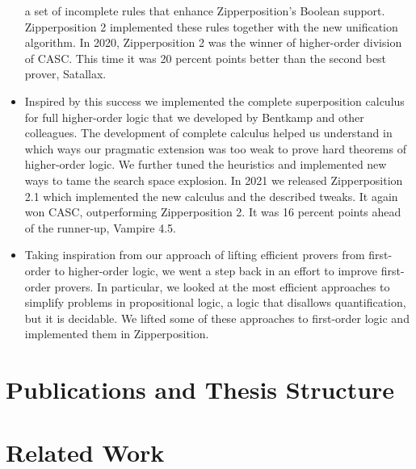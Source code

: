 \begin{itemize}
  a set of incomplete rules that enhance Zipperposition's Boolean support.
  Zipperposition 2 implemented these rules together with the new unification
  algorithm. In 2020, Zipperposition 2 was the winner of higher-order division
  of CASC. This time it was 20 percent points better than the second best
  prover, Satallax.
  \item Inspired by this success we implemented the complete superposition
  calculus for full higher-order logic that we developed by Bentkamp and other
  colleagues. The development of complete calculus helped us understand in which
  ways our pragmatic extension was too weak to prove hard theorems of
  higher-order logic. We further tuned the heuristics and implemented new ways
  to tame the search space explosion. In 2021 we released Zipperposition 2.1
  which implemented the new calculus and the described tweaks. It again won
  CASC, outperforming Zipperposition 2. It was 16 percent points ahead of the
  runner-up, Vampire 4.5. 

  \item Taking inspiration from our approach of lifting efficient provers from
  first-order to higher-order logic, we went a step back in an effort to improve
  first-order provers. In particular, we looked at the most efficient approaches
  to simplify problems in propositional logic, a logic that disallows quantification,
  but it is decidable. We lifted some of these approaches to first-order logic
  and implemented them in Zipperposition. 

\end{itemize}

\section{Publications and Thesis Structure}
\section{Related Work}






